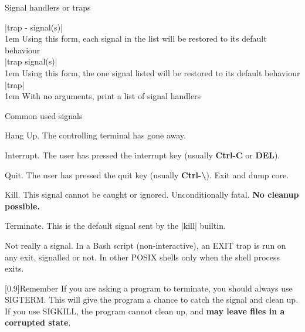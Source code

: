 \begin{frame}{Signal handlers or traps}
\begin{onlyenv}
        \endgroup
        \colorbox{background-color}{\bash|trap - signal(s)|}\\[0.3em]
        \begingroup\leftskip1em
            Using this form, each signal in the list will be restored to its default behaviour\\[0.4em]
        \endgroup
        \colorbox{background-color}{\bash|trap signal(s)|}\\[0.3em]
        \begingroup\leftskip1em
            Using this form, the one signal listed will be restored to its default behaviour\\[0.4em]
        \endgroup
        \colorbox{background-color}{\bash|trap|}\\[0.3em]
        \begingroup\leftskip1em
            With no arguments, print a list of signal handlers\\
        \endgroup
    \end{onlyenv}
\end{frame}
\begin{frame}{Common used signals}
    \begin{description}[TERMX]
        \item[\textbf{HUP}] Hang Up. The controlling terminal has gone away.
        \item[\textbf{INT}] Interrupt. The user has pressed the interrupt key (usually \textbf{Ctrl-C} or \textbf{DEL}).
        \item[\textbf{QUIT}] Quit. The user has pressed the quit key (usually \textbf{Ctrl-\textbackslash}). Exit and dump core.
        \item[\textbf{KILL}] Kill. \alert{This signal cannot be caught or ignored.} Unconditionally fatal. \textbf{\textbf{No cleanup possible.}}
        \item[\textbf{TERM}] Terminate. This is the default signal sent by the \bash|kill| builtin.
        \item[\textbf{EXIT}] Not really a signal. In a Bash script (non-interactive), an EXIT trap is run on any exit, signalled or not. In other POSIX shells only when the shell process exits.
    \end{description}
    \begin{varblock}{}[0.9\textwidth]{Remember}
        If you are asking a program to terminate, you should always use SIGTERM.%
        This will give the program a chance to catch the signal and clean up.
        If you use SIGKILL, the program cannot clean up, and \textbf{may leave files in a corrupted state}.
    \end{varblock}
\end{frame}
